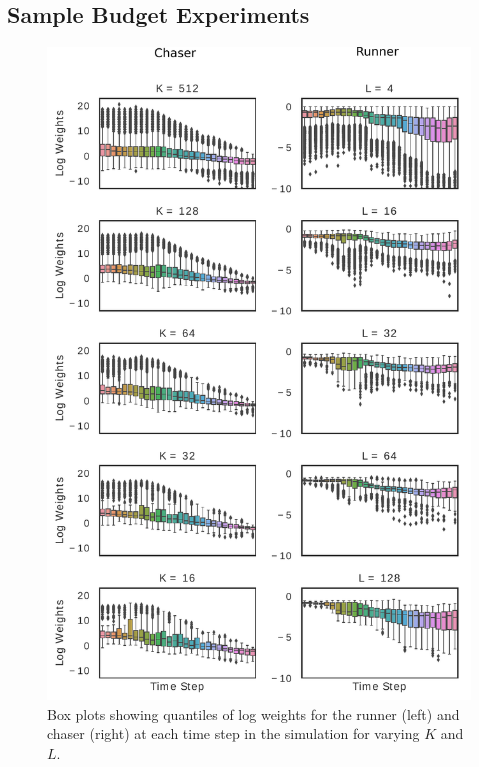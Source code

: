 \documentclass{article}
\begin{document}
\subsection{Sample Budget Experiments}

\begin{figure}[!t]
\begin{center}
\centerline{\hspace{-0.2em}\includegraphics[width=1.05\columnwidth]{PLOT_B_barplots.pdf}}
\caption{Box plots showing quantiles of log weights for the runner (left) and chaser (right) at each time step in the simulation for varying $K$ and $L$.}
\label{fig:box_plots}
\end{center}
\end{figure} 
\end{document}
